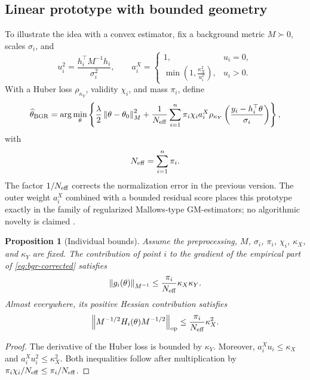 \documentclass[10pt,a4paper]{article}
\newtheorem{proposition}[theorem]{Proposition}
\newcommand{\norm}[1]{\left\lVert #1\right\rVert}
\begin{document}
\subsection{Linear prototype with bounded geometry}
To illustrate the idea with a convex estimator, fix a background metric $M\succ0$, scales $\sigma_i$, and
\[
u_i^2=\frac{h_i^\top M^{-1}h_i}{\sigma_i^2},
\qquad
a_i^X=
\begin{cases}
1,&u_i=0,\\[1mm]
\displaystyle\min\left(1,\frac{\kappa_X^2}{u_i^2}\right),&u_i>0.
\end{cases}
\]
With a Huber loss $\rho_{\kappa_Y}$, validity $\chi_i$, and mass $\pi_i$, define
\begin{equation}
\widehat\theta_{\rm BGR}
=
\arg\min_\theta
\left\{
\frac\lambda2\norm{\theta-\theta_0}_M^2
+
\frac{1}{N_{\rm eff}}
\sum_{i=1}^n
\pi_i\chi_i a_i^X
\rho_{\kappa_Y}\left(\frac{y_i-h_i^\top\theta}{\sigma_i}\right)
\right\},
\label{eq:bgr-corrected}
\end{equation}
with
\begin{equation}
N_{\rm eff}=\sum_{i=1}^n\pi_i.
\label{eq:effective-mass}
\end{equation}
The factor $1/N_{\rm eff}$ corrects the normalization error in the previous version. The outer weight $a_i^X$ combined with a bounded residual score places this prototype exactly in the family of regularized Mallows-type GM-estimators; no algorithmic novelty is claimed \citep{huber1964,mallows1975,krasker1982,richardson1997}.

\begin{proposition}[Individual bounds]
Assume the preprocessing, $M$, $\sigma_i$, $\pi_i$, $\chi_i$, $\kappa_X$, and $\kappa_Y$ are fixed. The contribution of point $i$ to the gradient of the empirical part of \eqref{eq:bgr-corrected} satisfies
\begin{equation}
\norm{g_i(\theta)}_{M^{-1}}
\leq
\frac{\pi_i}{N_{\rm eff}}\kappa_X\kappa_Y.
\label{eq:gradient-bound}
\end{equation}
Almost everywhere, its positive Hessian contribution satisfies
\begin{equation}
\norm{M^{-1/2}H_i(\theta)M^{-1/2}}_{\rm op}
\leq
\frac{\pi_i}{N_{\rm eff}}\kappa_X^2.
\label{eq:hessian-bound}
\end{equation}
\end{proposition}

\begin{proof}
The derivative of the Huber loss is bounded by $\kappa_Y$. Moreover, $a_i^Xu_i\leq\kappa_X$ and $a_i^Xu_i^2\leq\kappa_X^2$. Both inequalities follow after multiplication by $\pi_i\chi_i/N_{\rm eff}\leq\pi_i/N_{\rm eff}$.
\end{proof}
\end{document}
